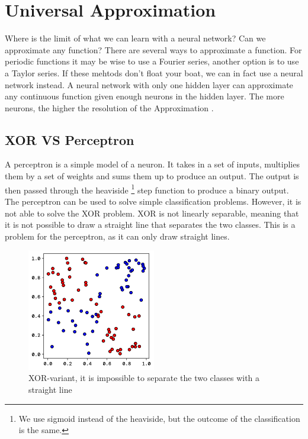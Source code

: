 \documentclass[twoside,11pt]{report}
\begin{document}
\section{Universal Approximation}
\label{sec:UAT}

Where is the limit of what we can learn with a neural network? Can we approximate any function?
There are several ways to approximate a function. For periodic functions it may be wise to use a Fourier series,
another option is to use a Taylor series. If these mehtods don't float your boat, we can in fact use a neural network
instead. A neural network with only one hidden layer can approximate any continuous function
given enough neurons in the hidden layer. The more neurons, the higher the resolution of the Approximation
\cite{HornikEtAl89}. 

%
\subsection*{XOR VS Perceptron}
\label{app:xor}

A perceptron is a simple model of a neuron. It takes in a set of inputs, multiplies them by a set of weights 
and sums them up to produce an output. The output is then passed through the heaviside
\footnote{We use sigmoid instead of the heaviside, but the outcome of the classification is the same.}
step function to produce
a binary output. The perceptron can be used to solve simple classification problems. However, it is not able to
solve the XOR problem. XOR is not linearly separable, meaning that it is not possible to draw a straight line
that separates the two classes. This is a problem for the perceptron, as it can only draw straight lines.

\begin{figure}[h]
    \begin{center}
        \includegraphics[width=0.5\textwidth]{../runsAndFigures/xor.png}
    \end{center}
    \caption{XOR-variant, it is impossible to separate the two classes with a straight line}\label{fig:xor_data}
\end{figure}
\end{document}
